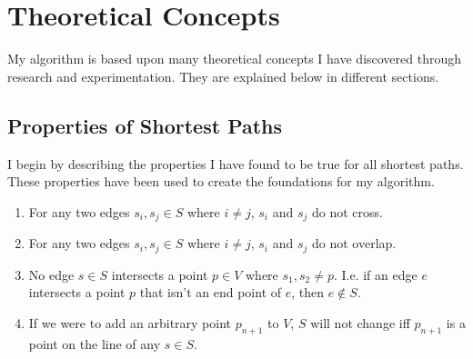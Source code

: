 \documentclass[12pt]{article}
\begin{document}
\section{Theoretical Concepts}\label{sec:theory}
My algorithm is based upon many theoretical concepts I have discovered through
research and experimentation. They are explained below in different sections.

\subsection{Properties of Shortest Paths}\label{subsec:props}
I begin by describing the properties I have found to be true for all shortest
paths. These properties have been used to create the foundations for my algorithm.
\begin{enumerate}
\item For any two edges $s_i,s_j \in S$ where $i \neq j$, $s_i$ and $s_j$ do not cross. 
\item For any two edges $s_i,s_j \in S$ where $i \neq j$, $s_i$ and $s_j$ do not overlap. 
\item No edge $s \in S$ intersects a point $p \in V$ where $s_1,s_2 \neq p$.
I.e. if an edge $e$ intersects a point $p$ that isn't an end point of $e$,
then $e \notin S$.
\item If we were to add an arbitrary point $p_{n+1}$ to $V$, $S$
will not change iff $p_{n+1}$ is a point on the line of any $s \in S$.
\end{enumerate}
\end{document}
